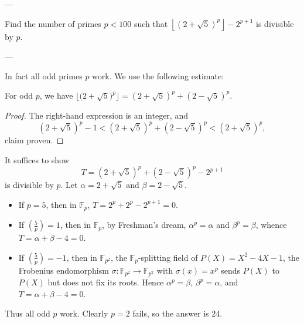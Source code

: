 
---

Find the number of primes $p<100$ such that $\left\lfloor(2+\sqrt5)^p\right\rfloor-2^{p+1}$ is divisible by $p$.

---

In fact all odd primes $p$ work. We use the following estimate:
\begin{iclaim*}
    For odd $p$, we have $\big\lfloor\big(2+\sqrt5\big)^p\big\rfloor=\left(2+\sqrt5\right)^p+\left(2-\sqrt5\right)^p$.
\end{iclaim*}
\begin{proof}
    The right-hand expression is an integer, and \[\textstyle\left(2+\sqrt5\right)^p-1<\left(2+\sqrt5\right)^p+\left(2-\sqrt5\right)^p<\left(2+\sqrt5\right)^p,\]
    claim proven.
\end{proof}

It suffices to show \[T=\textstyle\left(2+\sqrt5\right)^p+\left(2-\sqrt5\right)^p-2^{p+1}\]
is divisible by $p$. Let $\alpha=2+\sqrt5$ and $\beta=2-\sqrt5$.
\begin{itemize}
    \item If $p=5$, then in $\mathbb F_p$, $T=2^p+2^p-2^{p+1}=0$.
    \item If $\left(\tfrac5p\right)=1$, then in $\mathbb F_p$, by Freshman's dream, $\alpha^p=\alpha$ and $\beta^p=\beta$, whence $T=\alpha+\beta-4=0$.
    \item If $\left(\frac5p\right)=-1$, then in $\mathbb F_{p^2}$, the $\mathbb F_p$-splitting field of $P(X)=X^2-4X-1$, the Frobenius endomorphism $\sigma:\mathbb F_{p^2}\to\mathbb F_{p^2}$ with $\sigma(x)=x^p$ sends $P(X)$ to $P(X)$ but does not fix its roots. Hence $\alpha^p=\beta$, $\beta^p=\alpha$, and $T=\alpha+\beta-4=0$.
\end{itemize}
Thus all odd $p$ work. Clearly $p=2$ fails, so the answer is $24$.


